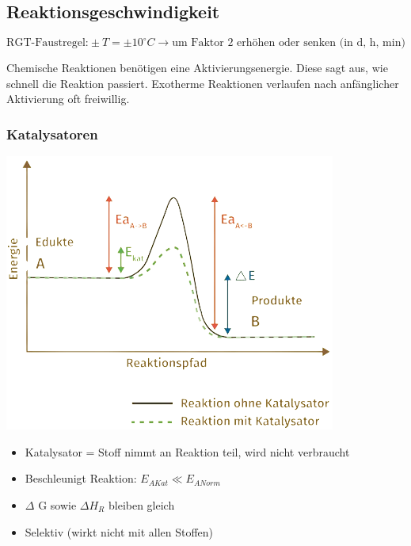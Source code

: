 \subsection{Reaktionsgeschwindigkeit}

$$ \boxed{\text{RGT-Faustregel:}\pm T=\pm 10^{\circ}C \rightarrow  \text{um Faktor 2 erhöhen oder senken (in d, h, min)}}$$

Chemische Reaktionen benötigen eine Aktivierungsenergie. \newline 
Diese sagt aus, wie schnell die Reaktion passiert.
Exotherme Reaktionen verlaufen nach anfänglicher Aktivierung oft freiwillig.

\subsubsection{Katalysatoren}
\label{Reaktionsgeschw}
\begin{minipage}{0.2\linewidth}
	\includegraphics[width=\linewidth]{images/Katalysator_1.png}
\end{minipage}
\hfill
\begin{minipage}{0.65\linewidth}
	\begin{itemize}
		\item Katalysator = Stoff nimmt an Reaktion teil, wird nicht verbraucht 
		\item Beschleunigt Reaktion: $E_{AKat} \ll E_{ANorm}$
		\item $\Delta$ G sowie $\Delta H_R$ bleiben gleich
		\item Selektiv (wirkt nicht mit allen Stoffen)
	\end{itemize}
\end{minipage}

